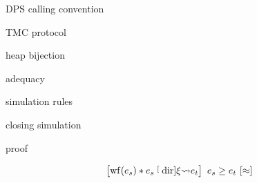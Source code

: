 DPS calling convention

TMC protocol


heap bijection


adequacy



simulation rules





%

closing simulation

proof


\begin{theorem}
    \[
        \iCsimvHoare{
            \wf{e_s} \iSep
            e_s \tmcDir{\xi} e_t
        }{
            \iSimilar
        }{
            e_s
        }{
            e_t
        }
    \]
\end{theorem}

